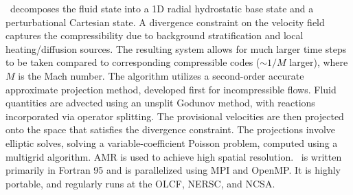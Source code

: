 
\maestro\ decomposes the fluid state into a 1D radial hydrostatic base
state and a perturbational Cartesian state.  A divergence constraint
on the velocity field captures the compressibility due to background
stratification and local heating/diffusion sources.  The resulting
system allows for much larger time steps to be taken compared to
corresponding compressible codes ($\sim 1/M$ larger), where $M$ is 
the Mach number.
The algorithm
\cite{multilevel} utilizes a second-order accurate approximate
projection method, developed first for incompressible flows.  Fluid
quantities are advected using an unsplit Godunov method, with
reactions incorporated via operator splitting.  The provisional
velocities are then projected onto the space that satisfies the
divergence constraint.  The projections involve elliptic solves,
solving a variable-coefficient Poisson problem,
computed using a multigrid algorithm.  AMR is
used to achieve high spatial resolution.  \maestro\ is written primarily
in Fortran 95 and is parallelized using MPI and OpenMP.  It is highly
portable, and regularly runs at the OLCF, NERSC, and NCSA.

